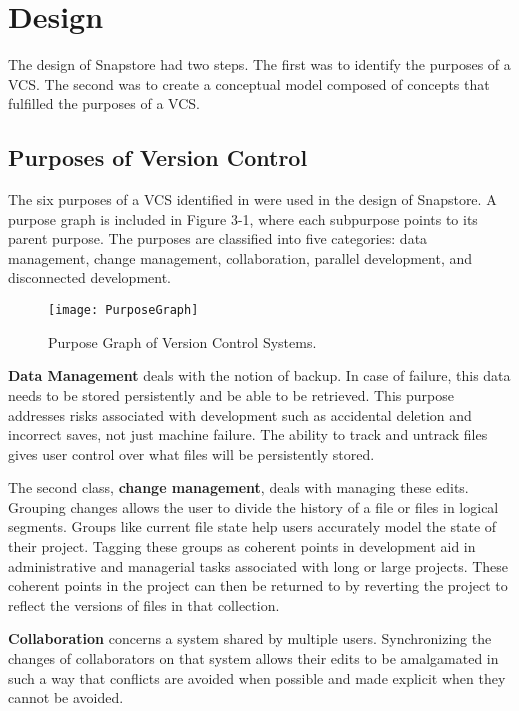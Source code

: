 \chapter{Design}

The design of Snapstore had two steps. The first was to identify the purposes of a VCS. The second was to create a conceptual model composed of concepts that fulfilled the purposes of a VCS.

\section{Purposes of Version Control}

The six purposes of a VCS identified in \cite{RossoJackson} were used in the design of Snapstore. A purpose graph is included in Figure 3-1, where each subpurpose points to its parent purpose. The purposes are classified into five categories: data management, change management, collaboration, parallel development, and disconnected development.

\begin{figure}
\texttt{[image: PurposeGraph]}
\caption{Purpose Graph of Version Control Systems.}
\label{arm:fig1}
\end{figure}

\textbf{Data Management} deals with the notion of backup. In case of failure, this data needs to be stored persistently and be able to be retrieved. This purpose addresses risks associated with development such as accidental deletion and incorrect saves, not just machine failure. The ability to track and untrack files gives user control over what files will be persistently stored.

The second class, \textbf{change management}, deals with managing these edits. Grouping changes allows the user to divide the history of a file or files in logical segments. Groups like current file state help users accurately model the state of their project. Tagging these groups as coherent points in development aid in administrative and managerial tasks associated with long or large projects. These coherent points in the project can then be returned to by reverting the project to reflect the versions of files in that collection.

\textbf{Collaboration} concerns a system shared by multiple users. Synchronizing the changes of collaborators on that system allows their edits to be amalgamated in such a way that conflicts are avoided when possible and made explicit when they cannot be avoided.

